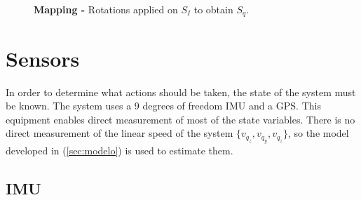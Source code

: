 \documentclass[conference]{IEEEtran}
\newcommand{\refp}[1]{(\ref{#1})}
\begin{document}
\begin{figure}[h!]
  \centering
  \caption{\textbf{Mapping -} Rotations applied on $S_I$ to obtain $S_q$.}
  \label{fig:rotaciones}
\end{figure}

\section{Sensors}

In order to determine what actions should be taken, the state of the system must be known. The system uses a 9 degrees of freedom IMU and a GPS. This equipment enables direct measurement of most of the state variables. There is no direct measurement of the linear speed of the system $\{v_{q_z},v_{q_y},v_{q_z}\}$, so the model developed in \refp{sec:modelo} is used to estimate them.

\subsection{IMU}
\label{sec:sensors-imu}
\end{document}
